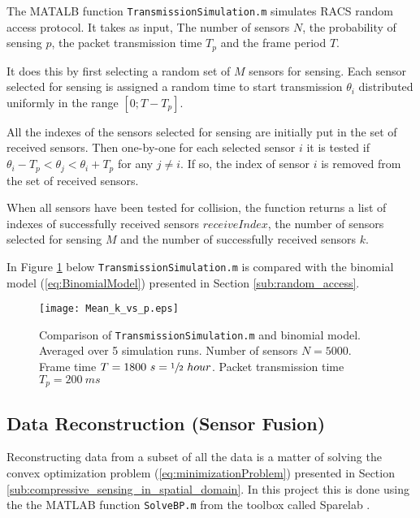 \documentclass[Main]{subfiles}
\begin{document}
		The MATALB function \texttt{TransmissionSimulation.m} simulates RACS random access protocol.
		It takes as input, The number of sensors $N$, the probability of sensing $p$, the packet transmission time $T_p$ and the frame period $T$.

		It does this by first selecting a random set of $M$ sensors for sensing.
		Each sensor selected for sensing is assigned a random time to start transmission $\theta_i$ distributed uniformly in the range $[0 ; T - T_p]$.

		All the indexes of the sensors selected for sensing are initially put in the set of received sensors.
		Then one-by-one for each selected sensor $i$ it is tested if 
		$\theta_i - T_p < \theta_j < \theta_i + T_p$
		for any
		$j \neq i$.
		If so, the index of sensor $i$ is removed from the set of received sensors.

		When all sensors have been tested for collision, the function returns a list of indexes of successfully received sensors $receiveIndex$, the number of sensors selected for sensing $M$ and the number of successfully received sensors $k$.

		In Figure \ref{fig:Mean_k_vs_p} below \texttt{TransmissionSimulation.m} is compared with the binomial model (\ref{eq:BinomialModel}) presented in Section \ref{sub:random_access}.

		\begin{figure}[H]
			\centering 
			\texttt{[image: Mean\_k\_vs\_p.eps]}
			\caption{Comparison of \texttt{TransmissionSimulation.m} and binomial model. Averaged over 5 simulation runs.
			Number of sensors $N = 5000$.
			Frame time $T = 1800\ s = \sfrac{1}{2}\ hour$.
			Packet transmission time $T_p = 200\ ms$}
			\label{fig:Mean_k_vs_p}
		\end{figure}

	

	\subsection{Data Reconstruction (Sensor Fusion)} %
	\label{sub:data_reconstruction}

		Reconstructing data from a subset of all the data is a matter of solving the convex optimization problem (\ref{eq:minimizationProblem}) presented in Section \ref{sub:compressive_sensing_in_spatial_domain}.
		In this project this is done using the the MATLAB function \texttt{SolveBP.m} from the toolbox called Sparelab \cite{SparseLab:Online}.
		
\end{document}
